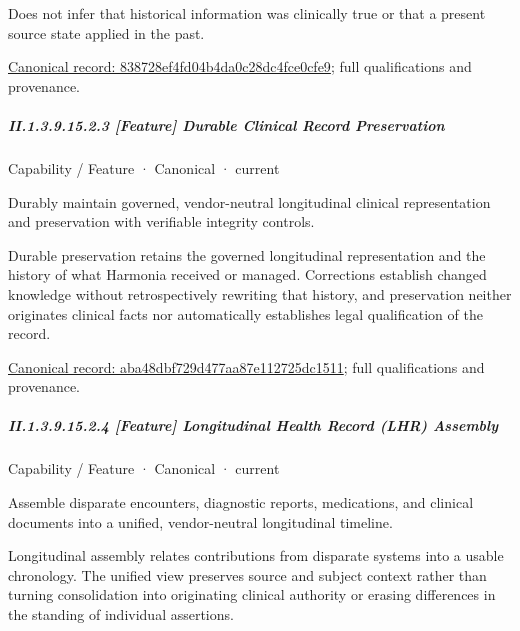Does not infer that historical information was clinically true or that a present source state applied in the past.


{\footnotesize \href{../../../../../../../continuum/strategy/capability/feature/838728ef4fd04b4da0c28dc4fce0cfe9.md}{Canonical record: 838728ef4fd04b4da0c28dc4fce0cfe9}; full qualifications and provenance.}\par
\subparagraph*{II.1.3.9.15.2.3 [Feature] Durable Clinical Record Preservation}
\label{navigation:II.1.3.9.15.2.3}

\label{element:aba48dbf729d477aa87e112725dc1511}
{\small Capability / Feature · Canonical · current}\par

Durably maintain governed, vendor-neutral longitudinal clinical representation and preservation with verifiable integrity controls.



Durable preservation retains the governed longitudinal representation and the history of what Harmonia received or managed. Corrections establish changed knowledge without retrospectively rewriting that history, and preservation neither originates clinical facts nor automatically establishes legal qualification of the record.


{\footnotesize \href{../../../../../../../continuum/strategy/capability/feature/aba48dbf729d477aa87e112725dc1511.md}{Canonical record: aba48dbf729d477aa87e112725dc1511}; full qualifications and provenance.}\par
\subparagraph*{II.1.3.9.15.2.4 [Feature] Longitudinal Health Record (LHR) Assembly}
\label{navigation:II.1.3.9.15.2.4}

\label{element:c9c1c7a58cb5470db0141329ecc349f4}
{\small Capability / Feature · Canonical · current}\par

Assemble disparate encounters, diagnostic reports, medications, and clinical documents into a unified, vendor-neutral longitudinal timeline.



Longitudinal assembly relates contributions from disparate systems into a usable chronology. The unified view preserves source and subject context rather than turning consolidation into originating clinical authority or erasing differences in the standing of individual assertions.


